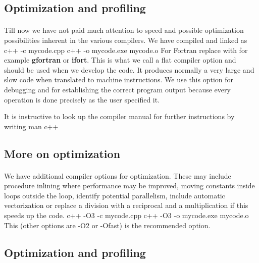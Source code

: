 \documentclass[%
oneside,                 %
final,                   %
10pt]{article}
\begin{document}
\noindent
\subsection{Optimization and profiling}

\paragraph{}


Till now we have not paid much attention to speed and possible optimization possibilities
inherent in the various compilers. We have compiled and linked as
\bcppcod
c++  -c  mycode.cpp
c++  -o  mycode.exe  mycode.o
\ecppcod
For Fortran replace with for example \textbf{gfortran} or \textbf{ifort}.
This is what we call a flat compiler option and should be used when we develop the code.
It produces normally a very large and slow code when translated to machine instructions.
We use this option for debugging and for establishing the correct program output because
every operation is done precisely as the user specified it.

It is instructive to look up the compiler manual for further instructions by writing
\bcppcod
man c++
\ecppcod


\subsection{More on optimization}

\paragraph{}
We have additional compiler options for optimization. These may include procedure inlining where 
performance may be improved, moving constants inside loops outside the loop, 
identify potential parallelism, include automatic vectorization or replace a division with a reciprocal
and a multiplication if this speeds up the code.
\bcppcod
c++  -O3 -c  mycode.cpp
c++  -O3 -o  mycode.exe  mycode.o
\ecppcod
This (other options are -O2 or -Ofast) is the recommended option.


\subsection{Optimization and profiling}

\end{document}
